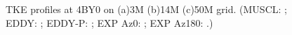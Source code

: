 \begin{figure}[t]
     \caption{TKE profiles at 4BY0 on (a)3M (b)14M (c)50M grid.  (MUSCL: \mline; EDDY: \eline; EDDY-P: \epline; EXP Az0: \bluediam; EXP Az180: \reddiam.)}
     \label{tke} 
\end{figure}
